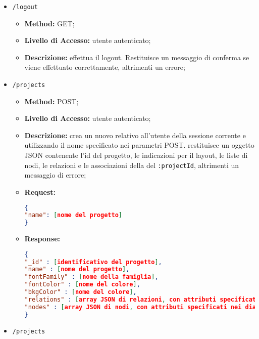\begin{itemize}
\begin{itemize}
\begin{lstlisting}[language=json,firstnumber=1]
{
"username" : [username che corrisponde all'indirizzo di posta elettronica che identifica l'utente];
"password" : [la password dell'account dell'utente].
}
\end{lstlisting}
\end{itemize}
\item \texttt{/logout}
\begin{itemize}
\item \textbf{Method:} GET;
\item \textbf{Livello di Accesso:} utente autenticato;
\item \textbf{Descrizione:} effettua il logout. Restituisce un messaggio di conferma se viene effettuato correttamente, altrimenti un errore;
\end{itemize}
\item \texttt{/projects}
\begin{itemize}
\item \textbf{Method:} POST;
\item \textbf{Livello di Accesso:} utente autenticato;
\item \textbf{Descrizione:} crea un nuovo  relativo all’utente della sessione corrente e utilizzando il nome specificato nei parametri POST. restituisce un oggetto JSON contenente l'id del progetto, le indicazioni per il layout, le liste di nodi, le relazioni e le associazioni della  del  \texttt{:projectId}, altrimenti un messaggio di errore;
\item \textbf{Request:}
\begin{lstlisting}[language=json,firstnumber=1]
{
"name": [nome del progetto]
}
\end{lstlisting}
\item \textbf{Response:}
\begin{lstlisting}[language=json,firstnumber=1]
{
"_id" : [identificativo del progetto],
"name" : [nome del progetto],
"fontFamily" : [nome della famiglia],
"fontColor" : [nome del colore],
"bkgColor" : [nome del colore],
"relations" : [array JSON di relazioni, con attributi specificati nei diagrammi delle classi],
"nodes" : [array JSON di nodi, con attributi specificati nei diagrammi delle classi]
}
\end{lstlisting}
\end{itemize}
\item \texttt{/projects}

\end{itemize}
